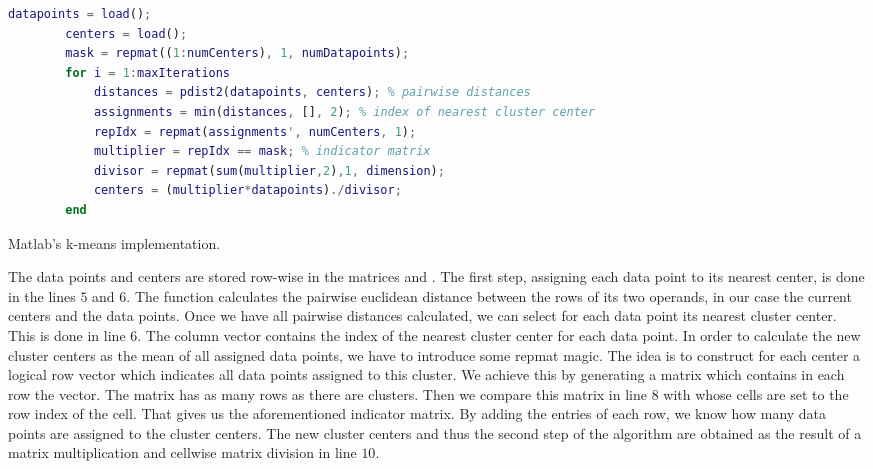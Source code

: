 \begin{listing}[!h]
	\begin{CenteredBox}
		\begin{lstlisting}[language=Matlab]
		datapoints = load();
		centers = load();
		mask = repmat((1:numCenters), 1, numDatapoints);
		for i = 1:maxIterations
  			distances = pdist2(datapoints, centers); % pairwise distances
  			assignments = min(distances, [], 2); % index of nearest cluster center
  			repIdx = repmat(assignments', numCenters, 1);
  			multiplier = repIdx == mask; % indicator matrix
  			divisor = repmat(sum(multiplier,2),1, dimension);
  			centers = (multiplier*datapoints)./divisor;
		end
		\end{lstlisting}
	\end{CenteredBox}
	\caption{Matlab's k-means implementation.}
	\label{lst:kmeansMatlab}
\end{listing}

The data points and centers are stored row-wise in the matrices  and .
The first step, assigning each data point to its nearest center, is done in the lines $5$ and $6$.
The  function calculates the pairwise euclidean distance between the rows of its two operands, in our case the current centers and the data points.
Once we have all pairwise distances calculated, we can select for each data point its nearest cluster center.
This is done in line $6$.
The  column vector contains the index of the nearest cluster center for each data point.
In order to calculate the new cluster centers as the mean of all assigned data points, we have to introduce some repmat magic.
The idea is to construct for each center a logical row vector which indicates all data points assigned to this cluster.
We achieve this by generating a matrix which contains in each row the  vector.
The matrix has as many rows as there are clusters.
Then we compare this matrix in line $8$ with  whose cells are set to the row index of the cell.
That gives us the aforementioned indicator matrix.
By adding the entries of each row, we know how many data points are assigned to the cluster centers.
The new cluster centers and thus the second step of the algorithm are obtained as the result of a matrix multiplication and cellwise matrix division in line $10$.	

